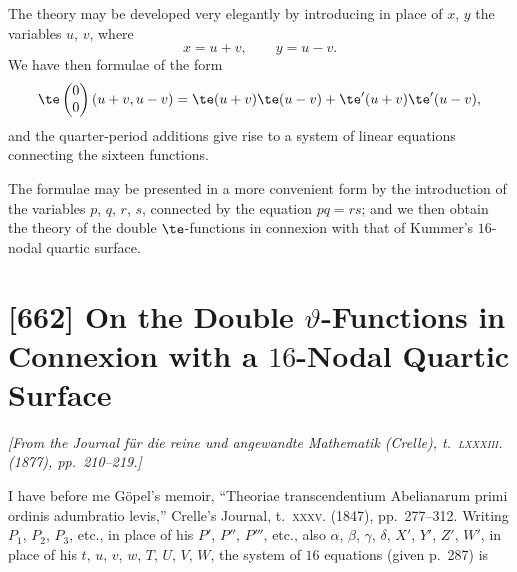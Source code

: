 \documentclass[11pt,a4paper]{book}
\begin{document}
The theory may be developed very elegantly by introducing in place of $x$, $y$ the variables $u$, $v$, where
\[
x = u + v, \qquad y = u - v.
\]
We have then formulae of the form
\[
\te\begin{pmatrix} 0 \\ 0 \end{pmatrix}(u + v, u - v) = \te(u + v) \te(u - v) + \te'(u + v) \te'(u - v),
\]
and the quarter-period additions give rise to a system of linear equations connecting the sixteen functions.

The formulae may be presented in a more convenient form by the introduction of the variables $p$, $q$, $r$, $s$, connected by the equation $pq = rs$; and we then obtain the theory of the double $\te$-functions in connexion with that of Kummer's $16$-nodal quartic surface.

\newpage
\section{[662] On the Double $\vartheta$-Functions in Connexion with a $16$-Nodal Quartic Surface}
\label{sec:662}

\noindent\textit{[From the \emph{Journal f\"ur die reine und angewandte Mathematik} (Crelle), t.~\textsc{lxxxiii}. (1877), pp.~210--219.]}

\medskip

I have before me G\"{o}pel's memoir, ``Theoriae transcendentium Abelianarum primi ordinis adumbratio levis,'' Crelle's Journal, t.~\textsc{xxxv}. (1847), pp.~277--312. Writing $P_1$, $P_2$, $P_3$, etc., in place of his $P'$, $P''$, $P'''$, etc., also $\alpha$, $\beta$, $\gamma$, $\delta$, $X'$, $Y'$, $Z'$, $W'$, in place of his $t$, $u$, $v$, $w$, $T$, $U$, $V$, $W$, the system of $16$ equations (given p.~287) is
\end{document}
